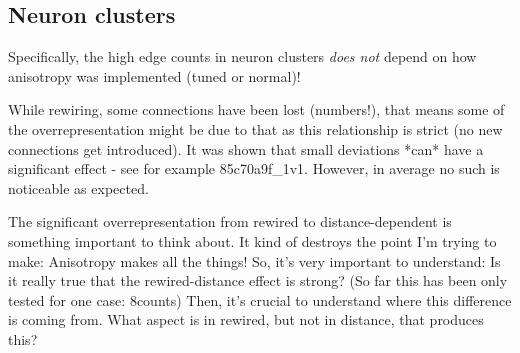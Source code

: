 \clearpage
\pagebreak
\newpage

\subsection*{Neuron clusters}





Specifically, the high edge counts in neuron clusters \textit{does
  not} depend on how anisotropy was implemented (tuned or normal)!

While rewiring, some connections have been lost (numbers!), that means
some of the overrepresentation might be due to that as this
relationship is strict (no new connections get introduced). It was
shown that small deviations *can* have a significant effect - see for
example 85c70a9f\_1v1. However, in average no such is noticeable as
expected. 

The significant overrepresentation from rewired to distance-dependent
is something important to think about. It kind of destroys the point
I'm trying to make: Anisotropy makes all the things! So, it's very
important to understand: Is it really true that the rewired-distance
effect is strong? (So far this has been only tested for one case:
8counts) Then, it's crucial to understand where this difference is
coming from. What aspect is in rewired, but not in distance, that
produces this?
